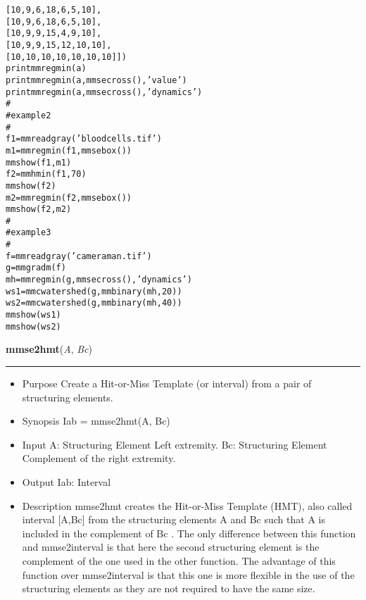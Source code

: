\begin{boxedminipage}{\textwidth}
\begin{alltt}
        [10,   9,   6,  18,   6,   5,  10],
        [10,   9,   6,  18,   6,   5,  10],
        [10,   9,   9,  15,   4,   9,  10],
        [10,   9,   9,  15,  12,  10,  10],
        [10,  10,  10,  10,  10,  10,  10]])
    print mmregmin(a)
    print mmregmin(a,mmsecross(),'value')
    print mmregmin(a,mmsecross(),'dynamics')
    \#
    \#   example 2
    \#
    f1=mmreadgray('bloodcells.tif')
    m1=mmregmin(f1,mmsebox())
    mmshow(f1,m1)
    f2=mmhmin(f1,70)
    mmshow(f2)
    m2=mmregmin(f2,mmsebox())
    mmshow(f2,m2)
    \#
    \#   example 3
    \#
    f=mmreadgray('cameraman.tif')
    g=mmgradm(f)
    mh=mmregmin(g,mmsecross(),'dynamics')
    ws1=mmcwatershed(g, mmbinary(mh, 20))
    ws2=mmcwatershed(g, mmbinary(mh, 40))
    mmshow(ws1)
    mmshow(ws2)\end{alltt}

    \vspace{1ex}

    \end{boxedminipage}

    \label{multireg:num_pymorph:mmse2hmt}
    \vspace{0.5ex}

    \begin{boxedminipage}{\textwidth}

    \raggedright \textbf{mmse2hmt}(\textit{A}, \textit{Bc})

    \vspace{-1.5ex}

    \rule{\textwidth}{0.5\fboxrule}
    \begin{itemize}
    \setlength{\parskip}{0.6ex}
      \item Purpose Create a Hit-or-Miss Template (or interval) from a pair 
        of structuring elements.

      \item Synopsis Iab = mmse2hmt(A, Bc)

      \item Input A: Structuring Element Left extremity. Bc: Structuring 
        Element Complement of the right extremity.

      \item Output Iab: Interval

      \item Description mmse2hmt creates the Hit-or-Miss Template (HMT), also 
        called interval [A,Bc] from the structuring elements A and Bc 
        such that A is included in the complement of Bc . The only 
        difference between this function and mmse2interval is that here 
        the second structuring element is the complement of the one used 
        in the other function. The advantage of this function over 
        mmse2interval is that this one is more flexible in the use of the 
        structuring elements as they are not required to have the same 
        size.

    \end{itemize}

    \vspace{1ex}

    \end{boxedminipage}

